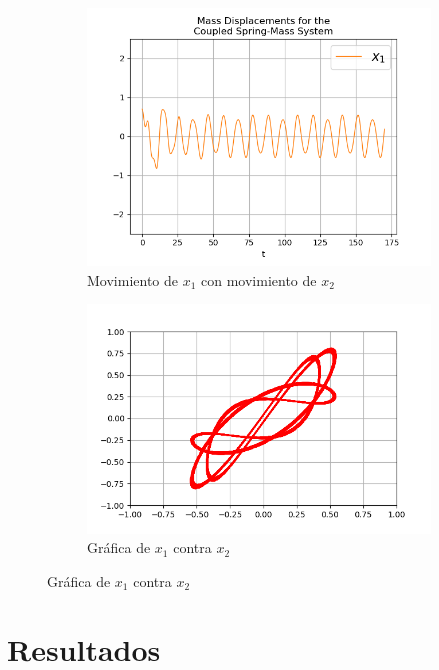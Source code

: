 \documentclass{article}
\begin{document}
\begin{figure}[ht!]
	\begin{subfigure}[b]{0.5\linewidth}
    \raggedleft
	\includegraphics[width=\linewidth]{ejercicio41-x1.png}
    \caption{Movimiento de $x_1$ con movimiento de $x_2$}
	\end{subfigure}
	\begin{subfigure}[b]{0.5\linewidth}
    \raggedright
	\includegraphics[width=\linewidth]{ejercicio41-versus.png}
	\caption{Gráfica de $x_1$ contra $x_2$}
    \end{subfigure}
\end{figure}

\newpage

\section{Resultados}
\end{document}
